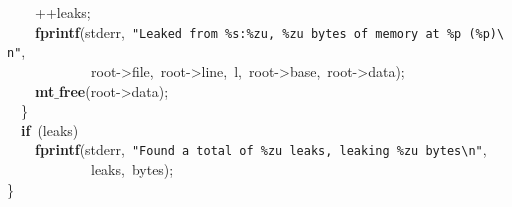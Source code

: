 \documentclass{article}
\begin{document}
\mbox{}\ \ \ \ ++leaks; \\
\mbox{}\ \ \ \ \textbf{fprintf}(stderr,\ \texttt{"{}Leaked\ from\ \%s:\%zu,\ \%zu\ bytes\ of\ memory\ at\ \%p\ (\%p)}\texttt{\textbackslash{}n}\texttt{"{}}, \\
\mbox{}\ \ \ \ \ \ \ \ \ \ \ \ root-\textgreater{}file,\ root-\textgreater{}line,\ l,\ root-\textgreater{}base,\ root-\textgreater{}data); \\
\mbox{}\ \ \ \ \textbf{mt$\_$free}(root-\textgreater{}data); \\
\mbox{}\ \ \} \\
\mbox{}\ \ \textbf{if}\ (leaks) \\
\mbox{}\ \ \ \ \textbf{fprintf}(stderr,\ \texttt{"{}Found\ a\ total\ of\ \%zu\ leaks,\ leaking\ \%zu\ bytes}\texttt{\textbackslash{}n}\texttt{"{}}, \\
\mbox{}\ \ \ \ \ \ \ \ \ \ \ \ leaks,\ bytes); \\
\mbox{}\} \\
\mbox{}
\end{document}
